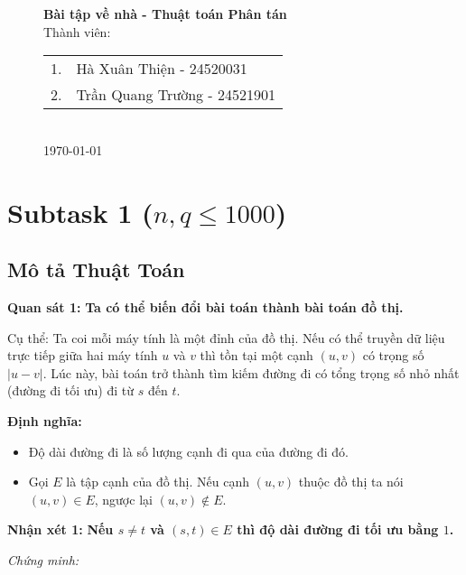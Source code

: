 \documentclass[12pt,a4paper]{article}
\begin{document}
	
	\begin{figure}
		\centering

		{\Large \textbf{Bài tập về nhà - Thuật toán Phân tán}}\\[1cm]
		{\large Thành viên:}\\[0.2cm]
		\begin{tabular}{ll}
			1. & Hà Xuân Thiện - 24520031 \\
			2. & Trần Quang Trường - 24521901 \\
		\end{tabular}\\[0.5cm]

		{\large \today}
	\end{figure}
	
	\tableofcontents
	
	\newpage
	\section{Subtask 1 ($n, q \le 1000$)}
	
	\subsection{Mô tả Thuật Toán}
	
	\textbf{Quan sát 1:}  
	\textbf{Ta có thể biến đổi bài toán thành bài toán đồ thị.}
	
	Cụ thể:  
	Ta coi mỗi máy tính là một đỉnh của đồ thị.  
	Nếu có thể truyền dữ liệu trực tiếp giữa hai máy tính $u$ và $v$ thì tồn tại một cạnh $(u, v)$ có trọng số $|u - v|$.  
	Lúc này, bài toán trở thành tìm kiếm đường đi có tổng trọng số nhỏ nhất (đường đi tối ưu) đi từ $s$ đến $t$.
	
	\textbf{Định nghĩa:}  
	\begin{itemize}
		\item Độ dài đường đi là số lượng cạnh đi qua của đường đi đó.  
		\item Gọi $E$ là tập cạnh của đồ thị. Nếu cạnh $(u, v)$ thuộc đồ thị ta nói $(u, v) \in E$, ngược lại $(u, v) \notin E$.
	\end{itemize}	
	\textbf{Nhận xét 1:}  
	\textbf{Nếu $s \ne t$ và $(s, t) \in E$ thì độ dài đường đi tối ưu bằng $1$.}
	
	\textit{Chứng minh:}  
\end{document}
